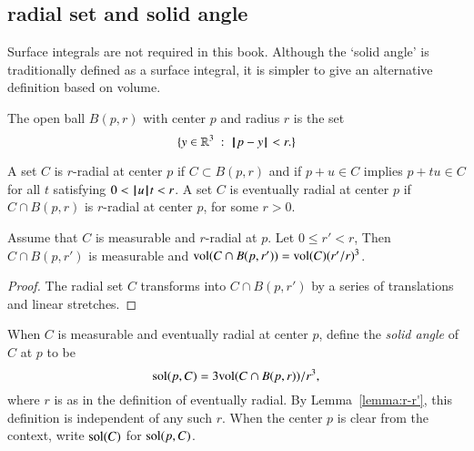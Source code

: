 \subsection{radial set and solid angle}\label{sec:solid}

Surface integrals are not required in this book.  Although
the `solid angle' is traditionally defined as a surface integral,
it is simpler to give an alternative definition based on volume.


\begin{definition}  The open ball $B(p,r)$ with center $p$ and
radius $r$ is the set
    $$
    \{ y\in\mathbb{R}^3 \ :\  {\hskip0.1em|\hskip-0.15em|\hskip0.1em}p - y{\hskip0.1em|\hskip-0.15em|\hskip0.1em} < r.\}
    $$
%
%
\end{definition}



\begin{definition}[radial]
    A set $C$ is $r$-radial at center $p$ if  $C\subset B(p,r)$
    and if
        $p + u \in C$ implies
        $p + t u \in C$ for all $t$ satisfying $0 < {{\hskip0.1em|\hskip-0.15em|\hskip0.1em}u{\hskip0.1em|\hskip-0.15em|\hskip0.1em}} t < r$.
A set $C$ is eventually radial at center $p$ if $C\cap B(p,r)$ is
$r$-radial at center $p$, for some $r>0$.
%
\end{definition}
%

\begin{lemma}
Assume that $C$ is measurable and $r$-radial at $p$.  Let $0\le r'<r$,
Then $C\cap B(p,r')$ is measurable and
${\operatorname{vol}}(C\cap B(p,r')) = {\operatorname{vol}}(C) (r'/r)^3$.
\end{lemma}

\begin{proof}  The radial set $C$ transforms into $C\cap B(p,r')$ by
a series of translations and linear stretches.
\end{proof}


\begin{definition}
When $C$ is measurable and eventually radial at center $p$, 
define the {\it solid angle} of $C$ at $p$ to be
    $$
    {\operatorname{sol}}(p,C) = 3 {\operatorname{vol}}(C\cap B(p,r))/r^3,
    $$
where $r$ is as in the definition of eventually radial. 
By Lemma~\ref{lemma:r-r'}, this
definition is independent of any such $r$.  When the center $p$ is
clear from the context, write ${\operatorname{sol}}(C)$ for
${\operatorname{sol}}(p,C)$.
%
%
\end{definition}



